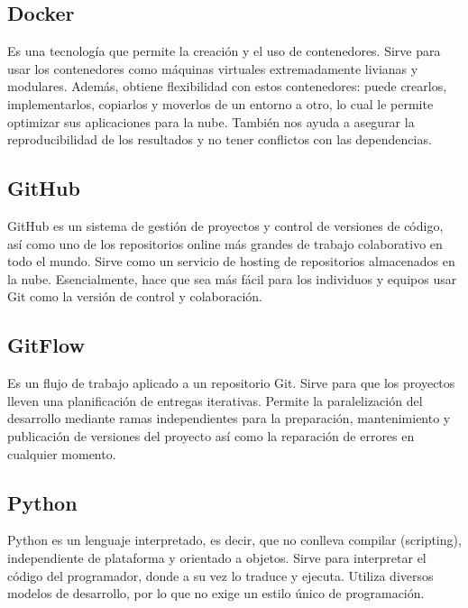 \documentclass[12pt,letterpaper]{article}
\begin{document}
\subsection*{Docker}
Es una tecnología que permite la creación y el uso de contenedores.
Sirve para usar los contenedores como máquinas virtuales extremadamente livianas y modulares.
Además, obtiene flexibilidad con estos contenedores: puede crearlos, implementarlos, copiarlos y
moverlos de un entorno a otro, lo cual le permite optimizar sus aplicaciones para la nube.
\citep{redhat_docker}
También nos ayuda a asegurar la reproducibilidad de los resultados y no tener conflictos con las
dependencias.

\subsection*{GitHub}
GitHub es un sistema de gestión de proyectos y control de versiones de código, así como uno de los
repositorios online más grandes de trabajo colaborativo en todo el mundo.
\citep{hostinger_tutoriales_2019}
Sirve como un servicio de hosting de repositorios almacenados en la nube.  Esencialmente, hace que
sea más fácil para los individuos y equipos usar Git como la versión de control y colaboración.
\citep{kinsta_2020}

\subsection*{GitFlow}
Es un flujo de trabajo aplicado a un repositorio Git. Sirve para que los proyectos lleven una
planificación de entregas iterativas. Permite la paralelización del desarrollo mediante ramas
independientes para la preparación, mantenimiento y publicación de versiones del proyecto así como
la reparación de errores en cualquier momento.
\citep{claventy_2020}

\subsection*{Python}
Python es un lenguaje interpretado, es decir, que no conlleva compilar (scripting), independiente de
plataforma y orientado a objetos. 
\citep{desarrollo_web_2003}
Sirve para interpretar el código del programador, donde a su vez lo traduce y ejecuta. Utiliza
diversos modelos de desarrollo, por lo que no exige un estilo único de programación.
\citep{angeles_2020}
\end{document}
